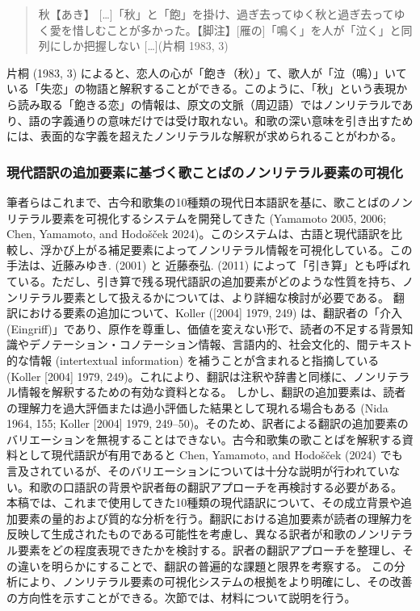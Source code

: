 \documentclass[
  letterpaper,
  DIV=11,
  numbers=noendperiod]{scrartcl}
\begin{document}
\begin{quote}
秋【あき】
{[}\ldots{]}「秋」と「飽」を掛け、過ぎ去ってゆく秋と過ぎ去ってゆく愛を惜しむことが多かった。【脚注】{[}雁の{]}「鳴く」を人が「泣く」と同列にしか把握しない
{[}\ldots{]}(片桐 1983, 3)
\end{quote}

片桐 (1983, 3)
によると、恋人の心が「飽き（秋）」て、歌人が「泣（鳴）」いている「失恋」の物語と解釈することができる。このように、「秋」という表現から読み取る「飽きる恋」の情報は、原文の文脈（周辺語）ではノンリテラルであり、語の字義通りの意味だけでは受け取れない。和歌の深い意味を引き出すためには、表面的な字義を超えたノンリテラルな解釈が求められることがわかる。

\subsubsection{現代語訳の追加要素に基づく歌ことばのノンリテラル要素の可視化}\label{ux73feux4ee3ux8a9eux8a33ux306eux8ffdux52a0ux8981ux7d20ux306bux57faux3065ux304fux6b4cux3053ux3068ux3070ux306eux30ceux30f3ux30eaux30c6ux30e9ux30ebux8981ux7d20ux306eux53efux8996ux5316}

筆者らはこれまで、古今和歌集の10種類の現代日本語訳を基に、歌ことばのノンリテラル要素を可視化するシステムを開発してきた
(Yamamoto 2005, 2006; Chen, Yamamoto, and Hodošček
2024)。このシステムは、古語と現代語訳を比較し、浮かび上がる補足要素によってノンリテラル情報を可視化している。この手法は、近藤みゆき.
(2001) と 近藤泰弘. (2011)
によって「引き算」とも呼ばれている。ただし、引き算で残る現代語訳の追加要素がどのような性質を持ち、ノンリテラル要素として扱えるかについては、より詳細な検討が必要である。
翻訳における要素の追加について、Koller ({[}2004{]} 1979, 249)
は、翻訳者の「介入
(Eingriff)」であり、原作を尊重し、価値を変えない形で、読者の不足する背景知識やデノテーション・コノテーション情報、言語内的、社会文化的、間テキスト的な情報
(intertextual information) を補うことが含まれると指摘している (Koller
{[}2004{]} 1979,
249)。これにより、翻訳は注釈や辞書と同様に、ノンリテラル情報を解釈するための有効な資料となる。
しかし、翻訳の追加要素は、読者の理解力を過大評価または過小評価した結果として現れる場合もある
(Nida 1964, 155; Koller {[}2004{]} 1979,
249--50)。そのため、訳者による翻訳の追加要素のバリエーションを無視することはできない。古今和歌集の歌ことばを解釈する資料として現代語訳が有用であると
Chen, Yamamoto, and Hodošček (2024)
でも言及されているが、そのバリエーションについては十分な説明が行われていない。和歌の口語訳の背景や訳者毎の翻訳アプローチを再検討する必要がある。
本稿では、これまで使用してきた10種類の現代語訳について、その成立背景や追加要素の量的および質的な分析を行う。翻訳における追加要素が読者の理解力を反映して生成されたものである可能性を考慮し、異なる訳者が和歌のノンリテラル要素をどの程度表現できたかを検討する。訳者の翻訳アプローチを整理し、その違いを明らかにすることで、翻訳の普遍的な課題と限界を考察する。
この分析により、ノンリテラル要素の可視化システムの根拠をより明確にし、その改善の方向性を示すことができる。次節では、材料について説明を行う。
\end{document}
